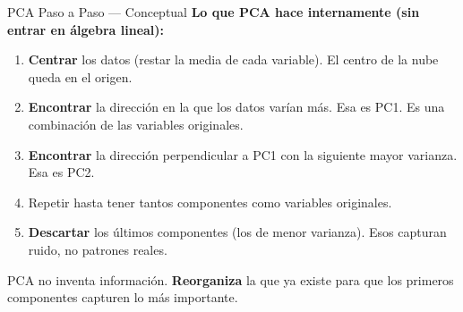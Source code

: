 \documentclass[aspectratio=169, 11pt]{beamer}
\begin{document}
\begin{frame}{PCA Paso a Paso --- Conceptual}
  \vspace{-4pt}
  {\footnotesize\color{arcaDark}\bfseries
    Lo que PCA hace internamente (sin entrar en \'algebra lineal):}

  \vspace{6pt}
  {\footnotesize
  \begin{enumerate}\setlength{\itemsep}{5pt}
    \item[{\color{arcaRed}\bfseries 1.}]
      \textbf{Centrar} los datos (restar la media de cada variable).
      El centro de la nube queda en el origen.
    \item[{\color{arcaRed}\bfseries 2.}]
      \textbf{Encontrar} la direcci\'on en la que los datos var\'ian m\'as.
      Esa es PC1. Es una combinaci\'on de las variables originales.
    \item[{\color{arcaRed}\bfseries 3.}]
      \textbf{Encontrar} la direcci\'on perpendicular a PC1 con la
      siguiente mayor varianza. Esa es PC2.
    \item[{\color{arcaRed}\bfseries 4.}]
      Repetir hasta tener tantos componentes como variables originales.
    \item[{\color{codeGreen}\bfseries 5.}]
      \textbf{Descartar} los \'ultimos componentes (los de menor varianza).
      Esos capturan ruido, no patrones reales.
  \end{enumerate}
  }

  \vspace{4pt}
  {\scriptsize\color{textMuted}
    \faLightbulb\hspace{4pt} PCA no inventa informaci\'on.
    \textbf{Reorganiza} la que ya existe para que los primeros
    componentes capturen lo m\'as importante.}
\end{frame}
\end{document}
